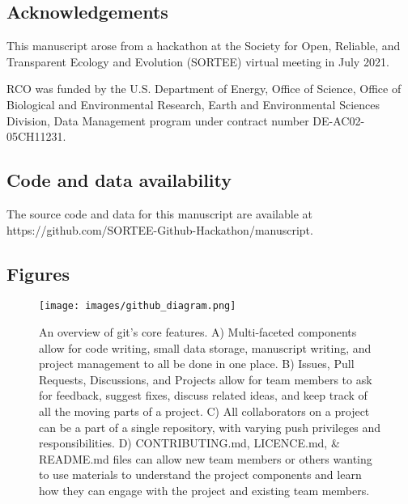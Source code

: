 \hypertarget{acknowledgements}{%
\subsection{Acknowledgements}\label{acknowledgements}}

This manuscript arose from a hackathon at the Society for Open, Reliable, and Transparent Ecology and Evolution (SORTEE) virtual meeting in July 2021.

RCO was funded by the U.S. Department of Energy, Office of Science, Office of Biological and Environmental Research, Earth and Environmental Sciences Division, Data Management program under contract number DE-AC02-05CH11231.

\hypertarget{code-and-data-availability}{%
\subsection{Code and data availability}\label{code-and-data-availability}}

The source code and data for this manuscript are available at https://github.com/SORTEE-Github-Hackathon/manuscript.

\hypertarget{figures}{%
\subsection{Figures}\label{figures}}

\begin{figure}
\hypertarget{fig:github-diagram}{%
\centering
\texttt{[image: images/github\_diagram.png]}
\caption{An overview of git's core features. A) Multi-faceted components allow for code writing, small data storage, manuscript writing, and project management to all be done in one place. B) Issues, Pull Requests, Discussions, and Projects allow for team members to ask for feedback, suggest fixes, discuss related ideas, and keep track of all the moving parts of a project. C) All collaborators on a project can be a part of a single repository, with varying push privileges and responsibilities. D) CONTRIBUTING.md, LICENCE.md, \& README.md files can allow new team members or others wanting to use materials to understand the project components and learn how they can engage with the project and existing team members.}\label{fig:github-diagram}
}
\end{figure}

